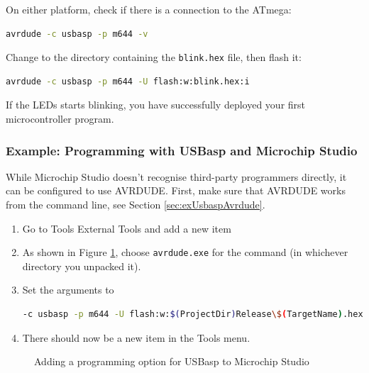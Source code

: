 \documentclass{article}
\newcommand{\file}[1]{\texttt{#1}}
\begin{document}
On either platform, check if there is a connection to the ATmega:
\begin{lstlisting}[language=bash]
avrdude -c usbasp -p m644 -v
\end{lstlisting}

Change to the directory containing the \file{blink.hex} file, then flash it:
\begin{lstlisting}[language=bash]
avrdude -c usbasp -p m644 -U flash:w:blink.hex:i
\end{lstlisting}

If the LEDs starts blinking, you have successfully deployed your first microcontroller program. 

\subsubsection{Example: Programming with USBasp and Microchip Studio}\label{sec:exMchpStudioProg}
While Microchip Studio doesn't recognise third-party programmers directly, it can be configured to use AVRDUDE. First, make sure that AVRDUDE works from the command line, see Section \ref{sec:exUsbaspAvrdude}. 

\begin{enumerate}
\item Go to Tools \textrightarrow{} External Tools and add a new item 
\item As shown in Figure \ref{fig:microchipStudioUSBasp}, choose \file{avrdude.exe} for the command (in whichever directory you unpacked it). 
\item Set the arguments to
\begin{lstlisting}[language=bash]
-c usbasp -p m644 -U flash:w:$(ProjectDir)Release\$(TargetName).hex:i
\end{lstlisting}
\item There should now be a new item in the Tools menu. 
\end{enumerate}

\begin{figure}[htb]
\centering
{}
\caption{Adding a programming option for USBasp to Microchip Studio}
\label{fig:microchipStudioUSBasp}
\end{figure}
\end{document}
